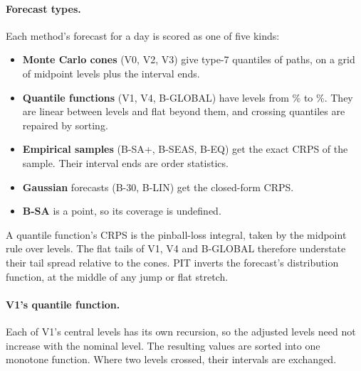 \paragraph{Forecast types.} Each method's forecast for a day is scored as
one of five kinds:
\begin{itemize}
\item \textbf{Monte Carlo cones} (V0, V2, V3) give type-7 quantiles
  \citep{hyndman1996} of  paths, on a grid of  midpoint levels
  plus the interval ends.
\item \textbf{Quantile functions} (V1, V4, B-GLOBAL) have  levels from
  \% to \%. They are linear between levels and flat beyond them, and
  crossing quantiles are repaired by sorting.
\item \textbf{Empirical samples} (B-SA+, B-SEAS, B-EQ) get the exact CRPS of
  the sample. Their interval ends are order statistics.
\item \textbf{Gaussian} forecasts (B-30, B-LIN) get the closed-form CRPS.
\item \textbf{B-SA} is a point, so its coverage is undefined.
\end{itemize}
A quantile function's CRPS is the pinball-loss integral, taken by the
midpoint rule over  levels. The flat tails of V1, V4 and B-GLOBAL
therefore understate their tail spread relative to the cones. PIT inverts
the forecast's distribution function, at the middle of any jump or flat
stretch.

\paragraph{V1's quantile function.} Each of V1's central levels has its own
recursion, so the adjusted levels need not increase with the nominal
level. The resulting values are sorted into one monotone function. Where
two levels crossed, their intervals are exchanged.

